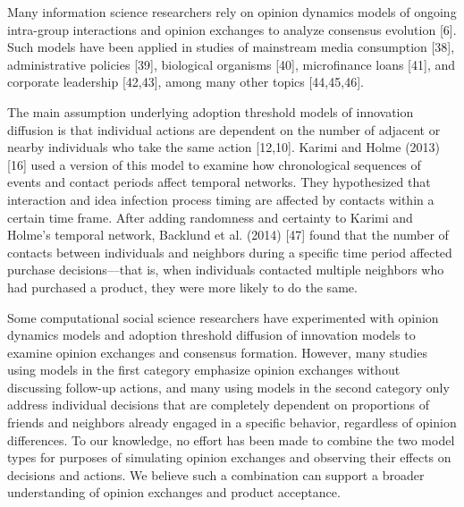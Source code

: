 \documentclass[10pt,letterpaper]{article}
\begin{document}
Many information science researchers rely on opinion dynamics models of ongoing intra-group interactions and opinion exchanges to analyze consensus evolution [6]. Such models have been applied in studies of mainstream media consumption [38], administrative policies [39], biological organisms [40], microfinance loans [41], and corporate leadership [42,43], among many other topics [44,45,46].

The main assumption underlying adoption threshold models of innovation diffusion is that individual actions are dependent on the number of adjacent or nearby individuals who take the same action [12,10]. Karimi and Holme (2013) [16] used a version of this model to examine how chronological sequences of events and contact periods affect temporal networks. They hypothesized that interaction and idea infection process timing are affected by contacts within a certain time frame. After adding randomness and certainty to Karimi and Holme's temporal network, Backlund et al. (2014) [47] found that the number of contacts between individuals and neighbors during a specific time period affected purchase decisions---that is, when individuals contacted multiple neighbors who had purchased a product, they were more likely to do the same.

Some computational social science researchers have experimented with opinion dynamics models and adoption threshold diffusion of innovation models to examine opinion exchanges and consensus formation. However, many studies using models in the first category emphasize opinion exchanges without discussing follow-up actions, and many using models in the second category only address individual decisions that are completely dependent on proportions of friends and neighbors already engaged in a specific behavior, regardless of opinion differences. To our knowledge, no effort has been made to combine the two model types for purposes of simulating opinion exchanges and observing their effects on decisions and actions. We believe such a combination can support a broader understanding of opinion exchanges and product acceptance.
\end{document}
